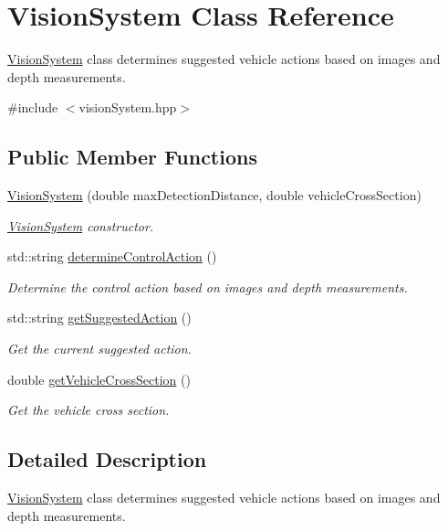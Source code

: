 \hypertarget{classVisionSystem}{\section{Vision\-System Class Reference}
\label{classVisionSystem}
}


\hyperlink{classVisionSystem}{Vision\-System} class determines suggested vehicle actions based on images and depth measurements.  




{\ttfamily \#include $<$vision\-System.\-hpp$>$}

\subsection*{Public Member Functions}
\begin{DoxyCompactItemize}
\item 
\hyperlink{classVisionSystem_a1d725448b142da1105419b186abcdaf0}{Vision\-System} (double max\-Detection\-Distance, double vehicle\-Cross\-Section)
\begin{DoxyCompactList}\small\item\em \hyperlink{classVisionSystem}{Vision\-System} constructor. \end{DoxyCompactList}\item 
std\-::string \hyperlink{classVisionSystem_ade324cc25762e22038d98f8cb76f0df3}{determine\-Control\-Action} ()
\begin{DoxyCompactList}\small\item\em Determine the control action based on images and depth measurements. \end{DoxyCompactList}\item 
std\-::string \hyperlink{classVisionSystem_af3ba2c91f91ba7f4646f90a78a9b5fbf}{get\-Suggested\-Action} ()
\begin{DoxyCompactList}\small\item\em Get the current suggested action. \end{DoxyCompactList}\item 
double \hyperlink{classVisionSystem_ae56f2ece1522170f4e24cd3974bfd3ba}{get\-Vehicle\-Cross\-Section} ()
\begin{DoxyCompactList}\small\item\em Get the vehicle cross section. \end{DoxyCompactList}\end{DoxyCompactItemize}


\subsection{Detailed Description}
\hyperlink{classVisionSystem}{Vision\-System} class determines suggested vehicle actions based on images and depth measurements. 

